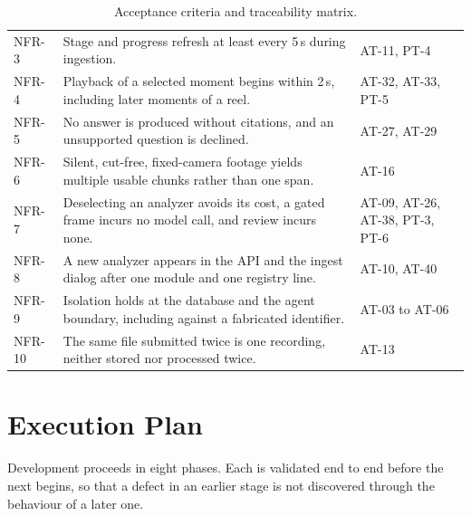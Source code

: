 \documentclass[11pt,a4paper]{article}
\begin{document}
\begin{table}[htbp]
\begin{tabularx}{\textwidth}{@{}L{1.1cm}XL{2.5cm}@{}}
NFR-3 & Stage and progress refresh at least every 5\,s during ingestion. & AT-11, PT-4 \\
NFR-4 & Playback of a selected moment begins within 2\,s, including later moments of a reel. & AT-32, AT-33, PT-5 \\
NFR-5 & No answer is produced without citations, and an unsupported question is declined. & AT-27, AT-29 \\
NFR-6 & Silent, cut-free, fixed-camera footage yields multiple usable chunks rather than one span. & AT-16 \\
NFR-7 & Deselecting an analyzer avoids its cost, a gated frame incurs no model call, and review incurs none. & AT-09, AT-26, AT-38, PT-3, PT-6 \\
NFR-8 & A new analyzer appears in the API and the ingest dialog after one module and one registry line. & AT-10, AT-40 \\
NFR-9 & Isolation holds at the database and the agent boundary, including against a fabricated identifier. & AT-03 to AT-06 \\
NFR-10 & The same file submitted twice is one recording, neither stored nor processed twice. & AT-13 \\
\bottomrule
\end{tabularx}
\caption{Acceptance criteria and traceability matrix.}
\end{table}

\section{Execution Plan}

Development proceeds in eight phases. Each is validated end to end before the
next begins, so that a defect in an earlier stage is not discovered through the
behaviour of a later one.
\end{document}
